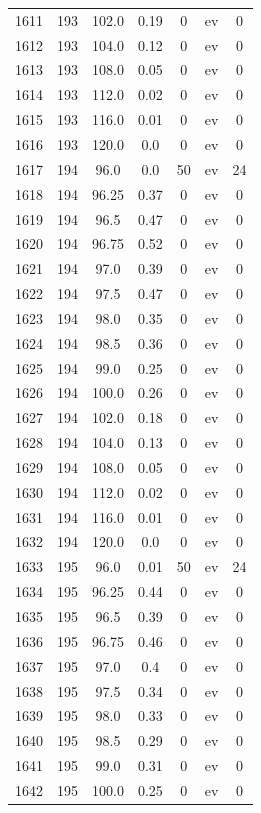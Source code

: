 \documentclass[12pt,a4paper]{article}
\begin{document}
\begin{tabular}{r|cccccc}
	1611 & 193 & 102.0 & 0.19 & 0 & ev & 0 \\
	1612 & 193 & 104.0 & 0.12 & 0 & ev & 0 \\
	1613 & 193 & 108.0 & 0.05 & 0 & ev & 0 \\
	1614 & 193 & 112.0 & 0.02 & 0 & ev & 0 \\
	1615 & 193 & 116.0 & 0.01 & 0 & ev & 0 \\
	1616 & 193 & 120.0 & 0.0 & 0 & ev & 0 \\
	1617 & 194 & 96.0 & 0.0 & 50 & ev & 24 \\
	1618 & 194 & 96.25 & 0.37 & 0 & ev & 0 \\
	1619 & 194 & 96.5 & 0.47 & 0 & ev & 0 \\
	1620 & 194 & 96.75 & 0.52 & 0 & ev & 0 \\
	1621 & 194 & 97.0 & 0.39 & 0 & ev & 0 \\
	1622 & 194 & 97.5 & 0.47 & 0 & ev & 0 \\
	1623 & 194 & 98.0 & 0.35 & 0 & ev & 0 \\
	1624 & 194 & 98.5 & 0.36 & 0 & ev & 0 \\
	1625 & 194 & 99.0 & 0.25 & 0 & ev & 0 \\
	1626 & 194 & 100.0 & 0.26 & 0 & ev & 0 \\
	1627 & 194 & 102.0 & 0.18 & 0 & ev & 0 \\
	1628 & 194 & 104.0 & 0.13 & 0 & ev & 0 \\
	1629 & 194 & 108.0 & 0.05 & 0 & ev & 0 \\
	1630 & 194 & 112.0 & 0.02 & 0 & ev & 0 \\
	1631 & 194 & 116.0 & 0.01 & 0 & ev & 0 \\
	1632 & 194 & 120.0 & 0.0 & 0 & ev & 0 \\
	1633 & 195 & 96.0 & 0.01 & 50 & ev & 24 \\
	1634 & 195 & 96.25 & 0.44 & 0 & ev & 0 \\
	1635 & 195 & 96.5 & 0.39 & 0 & ev & 0 \\
	1636 & 195 & 96.75 & 0.46 & 0 & ev & 0 \\
	1637 & 195 & 97.0 & 0.4 & 0 & ev & 0 \\
	1638 & 195 & 97.5 & 0.34 & 0 & ev & 0 \\
	1639 & 195 & 98.0 & 0.33 & 0 & ev & 0 \\
	1640 & 195 & 98.5 & 0.29 & 0 & ev & 0 \\
	1641 & 195 & 99.0 & 0.31 & 0 & ev & 0 \\
	1642 & 195 & 100.0 & 0.25 & 0 & ev & 0 \\

\end{tabular}
\end{document}
